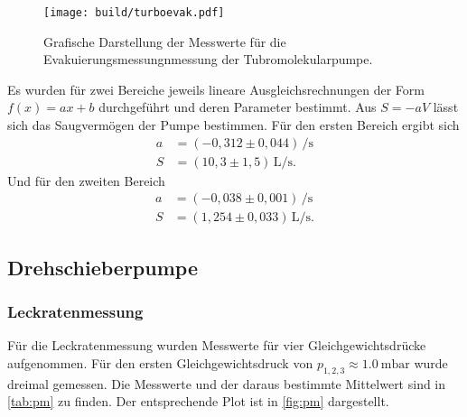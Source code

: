 \begin{figure}[H]
  \centering
  \texttt{[image: build/turboevak.pdf]}
  \caption{Grafische Darstellung der Messwerte für die Evakuierungsmessungnmessung der Tubromolekularpumpe.}
  \label{fig:turboevak}
\end{figure}

Es wurden für zwei Bereiche jeweils lineare Ausgleichsrechnungen der Form $f(x)=ax+b$ durchgeführt und deren
Parameter bestimmt. Aus $S=-aV$ lässt sich das Saugvermögen der Pumpe bestimmen. Für den ersten Bereich ergibt
sich
\begin{align*}
  a &= (-0,312 \pm 0,044)\,\si{\per\second}\\
  S &= (10,3 \pm 1,5)\,\si{\liter\per\second}.
\end{align*}
Und für den zweiten Bereich
\begin{align*}
  a &= (-0,038 \pm 0,001)\,\si{\per\second}\\
  S &=(1,254 \pm 0,033)\,\si{\liter\per\second}.
\end{align*}

\subsection{Drehschieberpumpe}
\subsubsection{Leckratenmessung}
Für die Leckratenmessung wurden Messwerte für vier Gleichgewichtsdrücke aufgenommen. Für den ersten
Gleichgewichtsdruck von $p_{1, 2, 3} \approx \SI{1,0}{\milli\bar}$ wurde dreimal gemessen.
Die Messwerte und der daraus bestimmte Mittelwert sind in \autoref{tab:pm} zu finden. Der entsprechende Plot
ist in \autoref{fig:pm} dargestellt.

